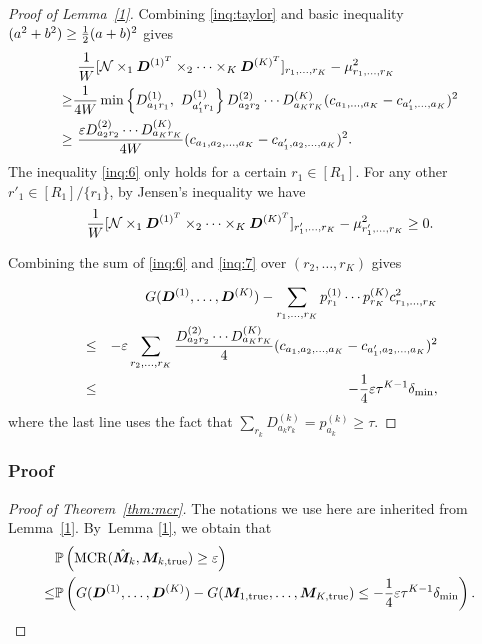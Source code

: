 \documentclass{article}
\DeclareMathOperator*{\mcr}{MCR}
\begin{document}
\begin{appendices}
\begin{proof}[Proof of Lemma~\ref{1}]
Combining \eqref{inq:taylor} and  basic inequality $(a^2+b^2)\geq {1\over 2}(a+b)^2$ gives
\begin{align}\label{inq:6}
&\ {1\over W}[\tN\times_1\mD^{(1)^T}\times_2\cdots \times_K\mD^{(K)^T}]_{r_1,\ldots,r_K}-\mu_{r_1,\ldots,r_K}^2\notag \\
   \geq & \frac{1}{4W}\min\left\{D_{a_1r_1}^{(1)},\ D_{a_1'r_1}^{(1)}\right\}D_{a_2r_2}^{(2)}\cdots D_{a_Kr_K}^{(K)}(c_{a_1,\ldots,a_K}-c_{a_1',\ldots,a_K})^2\notag \\
   \geq &\ \frac{\varepsilon D_{a_2r_2}^{(2)}\cdots D_{a_Kr_K}^{(K)}}{4W}(c_{a_1,a_2,\ldots,a_K}-c_{a_1',a_2,\ldots,a_K})^2.
\end{align}
The inequality \eqref{inq:6} only holds for a certain $r_1\in[R_1]$. For any other $r'_1\in [R_1]/\{r_1\}$, by Jensen's inequality we have
\begin{equation} 
    \frac{1}{W}[\mathcal{N}\times_1\bm{D}^{(1)^T}\times_2\cdots \times_K\bm{D}^{(K)^T}]_{r'_1,\ldots,r_K}-\mu^2_{r'_1,\ldots,r_K} \geq 0.
    \label{inq:7}
\end{equation}


Combining the sum of \eqref{inq:6} and \eqref{inq:7} over $(r_2,\ldots,r_K)$ gives

\begin{eqnarray*}
&& G(\bm{D}^{(1)},\ldots,\bm{D}^{(K)})-\sum_{r_1,\ldots,r_K} p^{(1)}_{r_1} \cdots p^{(K)}_{r_K} c^2_{r_1,\ldots,r_K}    \\
&\leq& -\varepsilon\displaystyle\sum_{r_2,\ldots,r_K}\frac{D_{a_2r_2}^{(2)}\cdots D_{a_Kr_K}^{(K)}}{4}(c_{a_1,a_2,\ldots,a_K}-c_{a_1',a_2,\ldots,a_K})^2\\
&\leq& -\frac{1}{4}\varepsilon\tau^{K-1}\delta_{\min},
\end{eqnarray*}
where the last line uses the fact that $\displaystyle\sum_{r_k}D_{a_kr_k}^{(k)}=p_{a_k}^{(k)}\geq \tau$. 
\end{proof}

\subsubsection{Proof}
\begin{proof}[Proof of Theorem~\ref{thm:mcr}]
The notations we use here are inherited from Lemma~\ref{1}. By~Lemma \ref{1}, we obtain that
\begin{align}\label{inq:1}
   &\mathbb{P}\left(\mcr(\hat{\mM}_k, \mM_{k,\text{true}})\geq \varepsilon\right)\notag \\
\leq & \mathbb{P}\left(G(\mD^{(1)},\ldots,\mD^{(K)})-G(\mM_{1,\text{true}},\ldots,\mM_{K,\text{true}})\leq -\frac{1}{4}\varepsilon\tau^{K-1}\delta_{\min}\right).
\end{align}



\end{proof}
\end{appendices}
\end{document}
